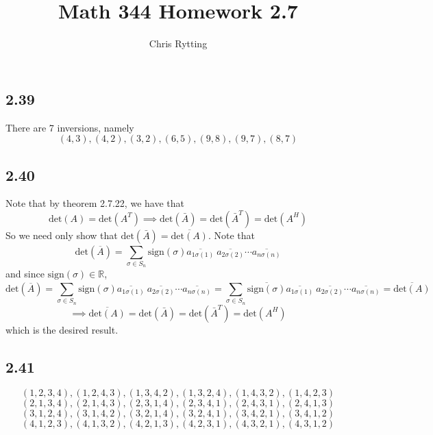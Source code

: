 \documentclass[letterpaper,12pt]{article}
\theoremstyle{definition}
\begin{document}
\title{Math 344 Homework 2.7}
\author{Chris Rytting}
\maketitle

\subsection*{2.39}
There are 7 inversions, namely
\[ (4,3), (4,2),(3,2),(6,5),(9,8),(9,7),(8,7)\]

\subsection*{2.40}
Note that by theorem 2.7.22, we have that
\[ \text{det} (A) = \text{det} (A^T) \implies \text{det}(\bar A) = \text{det} (\bar A^T) = \text{det} (A^H)\]
So we need only show that $\text{det} (\bar A) = \overline{\text{det} (A)}$. Note that 
\[\text{det}(\overline{A}) = \sum^{}_{\sigma \in S_n} \text{sign} (\sigma) \overline{a_{1 \sigma(1)}}~\overline{a_{2 \sigma(2)}}\cdots\overline{a_{n \sigma(n)}}\]
and since $\text{sign} (\sigma) \in \mathbb{R}$,
\[\text{det}(\overline{A}) = \sum^{}_{\sigma \in S_n} \text{sign} (\sigma) \overline{a_{1 \sigma(1)}}~\overline{a_{2 \sigma(2)}}\cdots\overline{a_{n \sigma(n)}} =
\sum^{}_{\sigma \in S_n} \overline{\text{sign} (\sigma) }\overline{a_{1 \sigma(1)}}~\overline{a_{2 \sigma(2)}}\cdots\overline{a_{n \sigma(n)}} = \overline{\text{det}(A)}\]
\[\implies\overline{\text{det}(A)}= \text{det}(\bar A) = \text{det} (\bar A^T) = \text{det} (A^H)\]
which is the desired result.

\subsection*{2.41}
\[ (1,2,3,4),(1,2,4,3),(1,3,4,2),(1,3,2,4),(1,4,3,2),(1,4,2,3)\]
\[ (2,1,3,4),(2,1,4,3),(2,3,1,4),(2,3,4,1),(2,4,3,1),(2,4,1,3)\]
\[ (3,1,2,4),(3,1,4,2),(3,2,1,4),(3,2,4,1),(3,4,2,1),(3,4,1,2)\]
\[ (4,1,2,3),(4,1,3,2),(4,2,1,3),(4,2,3,1),(4,3,2,1),(4,3,1,2)\]
\end{document}
